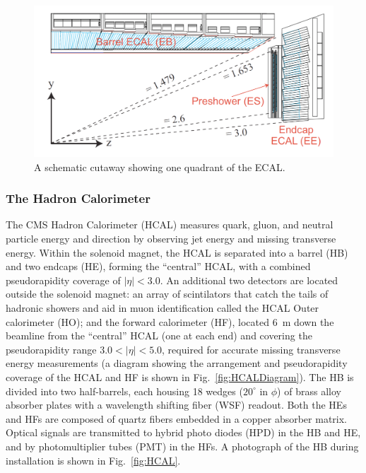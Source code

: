 \begin{figure}[H]
    \centering
    \includegraphics[width=\textwidth]{Images/CMS/ECALDiagram.png}
    \caption{A schematic cutaway showing one quadrant of the ECAL.}
    \label{fig:ECALDiagram}
\end{figure}

\subsubsection{The Hadron Calorimeter} \label{sec:HCAL}

The CMS Hadron Calorimeter (HCAL) \cite{HCALTDR} measures quark, gluon, and neutral particle energy and direction by observing jet energy and missing transverse energy. Within the solenoid magnet, the HCAL is separated into a barrel (HB) and two endcaps (HE), forming the ``central'' HCAL, with a combined pseudorapidity coverage of $|\eta| < 3.0$. An additional two detectors are located outside the solenoid magnet: an array of scintilators that catch the tails of hadronic showers and aid in muon identification called the HCAL Outer calorimeter (HO); and the forward calorimeter (HF), located \SI{6}{m} down the beamline from the ``central'' HCAL (one at each end) and covering the pseudorapidity range $3.0<|\eta|<5.0$, required for accurate missing transverse energy measurements (a diagram showing the arrangement and pseudorapidity coverage of the HCAL and HF is shown in Fig.~\ref{fig:HCALDiagram}). The HB is divided into two half-barrels, each housing 18 wedges ($20^{\circ}$ in $\phi$) of brass alloy absorber plates with a wavelength shifting fiber (WSF) readout. Both the HEs and HFs are composed of quartz fibers embedded in a copper absorber matrix. Optical signals are transmitted to hybrid photo diodes (HPD) in the HB and HE, and by photomultiplier tubes (PMT) in the HFs. A photograph of the HB during installation is shown in Fig.~\ref{fig:HCAL}.

